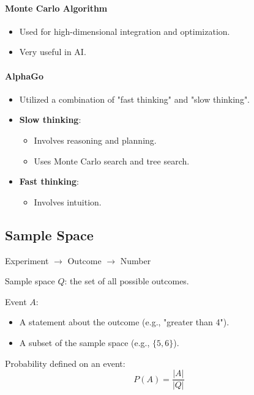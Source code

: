 \documentclass[12pt]{article}
\begin{document}
\paragraph{Monte Carlo Algorithm}
\begin{itemize}
    \item Used for high-dimensional integration and optimization.
    \item Very useful in AI.
\end{itemize}

\paragraph{AlphaGo}
\begin{itemize}
    \item Utilized a combination of "fast thinking" and "slow thinking".
    \item \textbf{Slow thinking}:
    \begin{itemize}
        \item Involves reasoning and planning.
        \item Uses Monte Carlo search and tree search.
    \end{itemize}
    \item \textbf{Fast thinking}:
    \begin{itemize}
        \item Involves intuition.
    \end{itemize}
\end{itemize}

\subsection{Sample Space}

\noindent
Experiment $\rightarrow$ Outcome $\rightarrow$ Number

\medskip

\noindent
Sample space $Q$: the set of all possible outcomes.

\medskip

\noindent
Event $A$:
\begin{itemize}
    \item A statement about the outcome (e.g., "greater than 4").
    \item A subset of the sample space (e.g., $\{5, 6\}$).
\end{itemize}

\noindent
Probability defined on an event:
\begin{equation}
    P(A) = \frac{|A|}{|Q|}
\end{equation}
\end{document}
